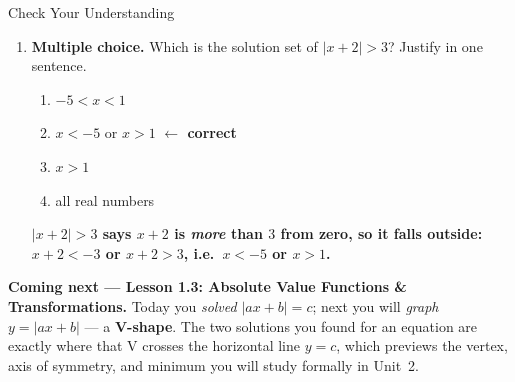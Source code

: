 \documentclass[12pt]{article}
\newcommand{\answerspace}[2]{\par\nopagebreak\noindent\begin{minipage}[t][#1][t]{\linewidth}%
  \color{keyred}\bfseries #2\end{minipage}\par}
\begin{document}
\begin{notesbox}{Check Your Understanding }
\begin{enumerate}[leftmargin=1.7em, itemsep=7pt]
  \item \textbf{Multiple choice.} Which is the solution set of $|x + 2| > 3$? Justify in one
        sentence.
    \begin{enumerate}[label=\Alph*., leftmargin=2.2em, itemsep=1pt]
      \item $-5 < x < 1$
      \item $x < -5$ \; or \; $x > 1$ \textcolor{keyred}{\textbf{$\leftarrow$ correct}}
      \item $x > 1$
      \item all real numbers
    \end{enumerate}
    \answerspace{1.2cm}{$|x+2|>3$ says $x+2$ is \emph{more} than $3$ from zero, so it falls outside: $x+2<-3$ or $x+2>3$, i.e.\ $x<-5$ or $x>1$.}
\end{enumerate}
\end{notesbox}

\boxguard[10]
\begin{spiralbox}
\textbf{Coming next --- Lesson 1.3: Absolute Value Functions \& Transformations.} Today you
\emph{solved} $|ax+b| = c$; next you will \emph{graph} $y = |ax+b|$ --- a \textbf{V-shape}. The two
solutions you found for an equation are exactly where that V crosses the horizontal line $y = c$,
which previews the vertex, axis of symmetry, and minimum you will study formally in Unit~2.
\end{spiralbox}
\end{document}
